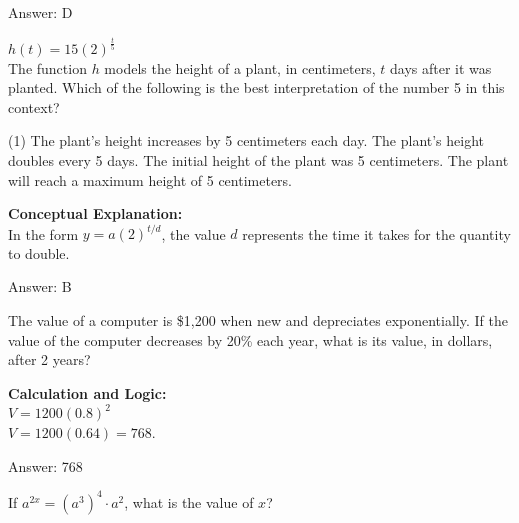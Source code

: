 \documentclass[11pt,paper=a4,answers]{exam}
\begin{document}
\begin{questions}
\begin{solution}
\vspace{25pt}

Answer: \colorbox{yellow!100}{D}
\end{solution}

\question
$h(t) = 15(2)^{\frac{t}{5}}$ \\
The function $h$ models the height of a plant, in centimeters, $t$ days after it was planted. Which of the following is the best interpretation of the number 5 in this context?
\begin{tasks}(1)
    \task The plant's height increases by 5 centimeters each day.
    \task The plant's height doubles every 5 days.
    \task The initial height of the plant was 5 centimeters.
    \task The plant will reach a maximum height of 5 centimeters.
\end{tasks}

\begin{solution}
\textbf{Conceptual Explanation:} \\
In the form $y = a(2)^{t/d}$, the value $d$ represents the time it takes for the quantity to double.

\vspace{25pt}

Answer: \colorbox{yellow!100}{B}
\end{solution}

\vspace{40pt}

\question
The value of a computer is \$1,200 when new and depreciates exponentially. If the value of the computer decreases by 20\% each year, what is its value, in dollars, after 2 years?

\begin{solution}
\textbf{Calculation and Logic:} \\
$V = 1200(0.8)^2$ \\
$V = 1200(0.64) = 768$.

\vspace{25pt}

Answer: \colorbox{yellow!100}{768}
\end{solution}

\vspace{40pt}

\question
If $a^{2x} = (a^3)^4 \cdot a^2$, what is the value of $x$?


\end{questions}
\end{document}
